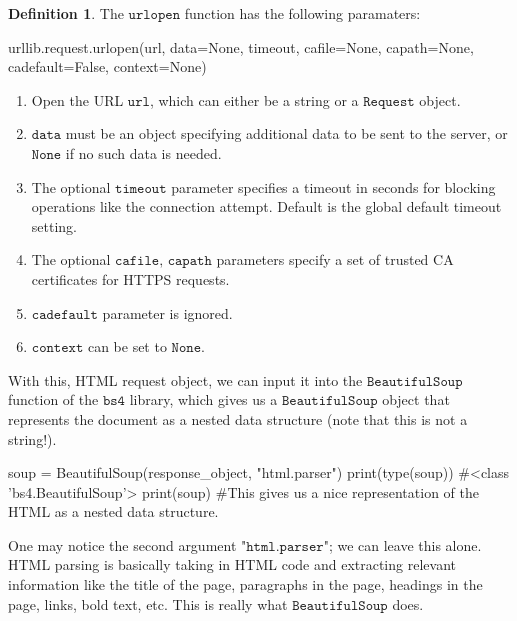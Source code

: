 \documentclass[a4paper, 12pt]{report}
\theoremstyle{remark}
\theoremstyle{definition}
\newtheorem{definition}{Definition}[section]
\begin{document}
\begin{definition}
The $\texttt{urlopen}$ function has the following paramaters: 
\begin{python}
urllib.request.urlopen(url, data=None, timeout, cafile=None, capath=None, cadefault=False, context=None)
\end{python}
\begin{enumerate}
    \item Open the URL $\texttt{url}$, which can either be a string or a $\texttt{Request}$ object. 
    \item $\texttt{data}$ must be an object specifying additional data to be sent to the server, or $\texttt{None}$ if no such data is needed. 
    \item The optional $\texttt{timeout}$ parameter specifies a timeout in seconds for blocking operations like the connection attempt. Default is the global default timeout setting. 
    \item The optional $\texttt{cafile, capath}$ parameters specify a set of trusted CA certificates for HTTPS requests. 
    \item $\texttt{cadefault}$ parameter is ignored. 
    \item $\texttt{context}$ can be set to $\texttt{None}$. 
\end{enumerate}
\end{definition}
With this, HTML request object, we can input it into the $\texttt{BeautifulSoup}$ function of the $\texttt{bs4}$ library, which gives us a $\texttt{BeautifulSoup}$ object that represents the document as a nested data structure (note that this is not a string!). 
\begin{python}
soup = BeautifulSoup(response_object, "html.parser")
print(type(soup))     #<class 'bs4.BeautifulSoup'>
print(soup)
#This gives us a nice representation of the HTML as a nested data structure.
\end{python}
One may notice the second argument $\texttt{"html.parser"}$; we can leave this alone. HTML parsing is basically taking in HTML code and extracting relevant information like the title of the page, paragraphs in the page, headings in the page, links, bold text, etc. This is really what $\texttt{BeautifulSoup}$ does. 
\end{document}
